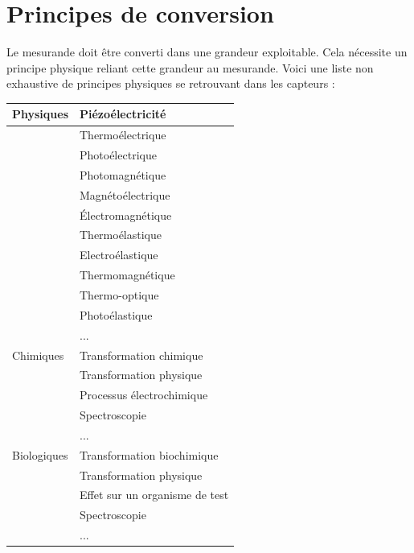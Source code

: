 \section{Principes de conversion}

Le mesurande doit être converti dans une grandeur exploitable. Cela nécessite un principe physique reliant cette grandeur au mesurande. Voici une liste non exhaustive de principes physiques se retrouvant dans les capteurs :

\begin {center}
\begin{tabular}{|p{4.2cm}|p{9.5cm}|}
    \hline
    Physiques   & Piézoélectricité               \\
    \hline
                & Thermoélectrique               \\
    \hline
                & Photoélectrique                \\
    \hline
                & Photomagnétique                \\
    \hline
                & Magnétoélectrique              \\
    \hline
                & Électromagnétique              \\
    \hline
                & Thermoélastique                \\
    \hline
                & Electroélastique               \\
    \hline
                & Thermomagnétique               \\
    \hline
                & Thermo-optique                 \\
    \hline
                & Photoélastique                 \\
    \hline
                & ...                            \\
    \hline
    Chimiques   & Transformation chimique        \\
    \hline
                & Transformation physique        \\
    \hline
                & Processus électrochimique      \\
    \hline
                & Spectroscopie                  \\
    \hline
                & ...                            \\
    \hline
    Biologiques & Transformation biochimique     \\
    \hline
                & Transformation physique        \\
    \hline
                & Effet sur un organisme de test \\
    \hline
                & Spectroscopie                  \\
    \hline
                & ...                            \\
    \hline
\end{tabular}
\end{center}

